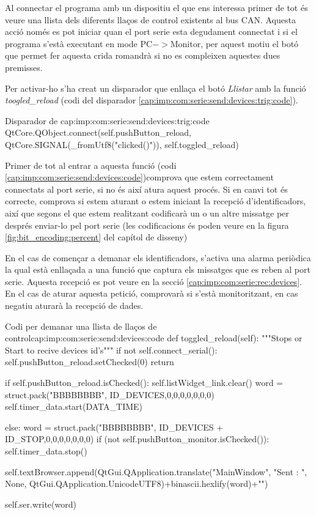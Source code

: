 Al connectar el programa \DCSMonitor amb un dispositiu \Monitor el que ens interessa primer de tot és veure una llista dels diferents llaços de control existents al bus CAN. Aquesta acció només es pot iniciar quan el port serie esta degudament connectat i si el programa s'està executant en mode PC$->$Monitor, per aquest motiu el botó que permet fer aquesta crida romandrà si no es compleixen aquestes dues premisses.

Per activar-ho s'ha creat un disparador que enllaça el botó \emph{Llistar} amb la funció \emph{toogled\_reload} (codi del disparador \ref{cap:imp:com:serie:send:devices:trig:code}).

\begin{code_python}{Disparador de }{cap:imp:com:serie:send:devices:trig:code}
QtCore.QObject.connect(self.pushButton_reload, QtCore.SIGNAL(_fromUtf8("clicked()")), self.toggled_reload)
\end{code_python}

Primer de tot al entrar a aquesta funció (codi \ref{cap:imp:com:serie:send:devices:code})comprova que estem correctament connectats al port serie, si no és així atura aquest procés. Si en canvi tot és correcte, comprova si estem aturant o estem iniciant la recepció d'identificadors, així que segons el que estem realitzant codificarà un o un altre missatge per després enviar-lo pel port serie (les codificacions és poden veure en la figura \ref{fig:bit_encoding:percent} del capítol de disseny)

En el cas de començar a demanar els identificadors, s'activa una alarma periòdica la qual està enllaçada a una funció que captura els missatges que es reben al port serie. Aquesta recepció es pot veure en la secció \ref{cap:imp:com:serie:rec:devices}.
En el cas de aturar aquesta petició, comprovarà si s'està monitoritzant, en cas negatiu aturarà la recepció de dades.

\begin{code_python}{Codi per demanar una llista de llaços de control}{cap:imp:com:serie:send:devices:code}
def toggled_reload(self):
    """Stops or Start to recive devices id's"""
    if not self.connect_serial():
        self.pushButton_reload.setChecked(0)
        return
        
    if self.pushButton_reload.isChecked():
        self.listWidget_link.clear()
        word = struct.pack("BBBBBBBB", ID_DEVICES,0,0,0,0,0,0,0)
        self.timer_data.start(DATA_TIME)
        
    else:
        word = struct.pack("BBBBBBBB", ID_DEVICES + ID_STOP,0,0,0,0,0,0,0)
        if (not self.pushButton_monitor.isChecked()):
            self.timer_data.stop()
        
    self.textBrowser.append(QtGui.QApplication.translate("MainWindow", "Sent : ", None, QtGui.QApplication.UnicodeUTF8)+binascii.hexlify(word)+"\n")
    
    self.ser.write(word)
\end{code_python}




